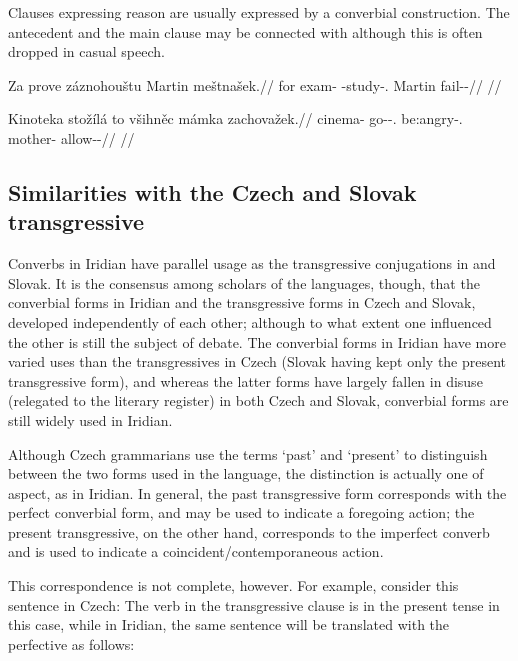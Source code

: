Clauses expressing reason are usually expressed by a converbial construction.
The antecedent and the main clause may be connected with 
although this is often dropped in casual speech.

\pex
\begingl
\gla Za prove záznohouštu Martin meštnašek.//
\glb for exam-\Acc{} \Neg{}-study-\Cv{}.\Pf{} Martin fail-\Av{}-\Pf{}//
\glft {}//
\endgl
\xe


\pex
\begingl
\gla Kinoteka stožílá to všihněc mámka zachovažek.//
\glb cinema-\Acc{} go-\Av{}-\Sbj{}.\Ipf{} \Rz{} be:angry-\Cv{}.\Ipf{} mother-\Dim{} allow-\Av{}-\Pf{}//
\glft {}//
\endgl
\xe


\subsection{Similarities with the Czech and Slovak transgressive}

Converbs in Iridian have parallel usage as the
transgressive conjugations in 
and Slovak. It is the consensus among scholars of the languages,
though, that the converbial forms in Iridian and the transgressive forms in
Czech and Slovak, developed independently of each other; although to what extent
one influenced the other is still the subject of debate. The converbial forms in
Iridian have more varied uses than the transgressives in Czech (Slovak having
kept only the present transgressive form), and whereas the latter forms have
largely fallen in disuse (relegated to the literary register) in both Czech and
Slovak, converbial forms are still widely used in Iridian.

Although Czech grammarians use the terms `past' and `present' to distinguish
between the two forms used in the language, the distinction is actually one of
aspect, as in Iridian. In general, the past transgressive form
corresponds with the perfect converbial form, and may be used to indicate a
foregoing action; the present transgressive, on the other hand, corresponds to
the imperfect converb and is used to indicate a coincident/contemporaneous
action.

This correspondence is not complete, however. For example, consider this
sentence in Czech:  The verb in the
transgressive clause is in the present tense in this case, while in Iridian, the
same sentence will be translated with the perfective as follows:

